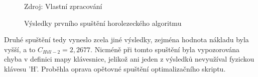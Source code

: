 \documentclass[a4paper, twoside, 12pt, czech]{article}
\begin{document}
\begin{figure}[h]
    \centering
    \caption{Výsledky prvního spuštění horolezeckého algoritmu}
    \vspace{0.5cm}
    \begin{keyboardlayout}
                     
        \newrow
                     
        \newrow
                    
        \newrow
                   
        \newrow
               
    \end{keyboardlayout}
    \small{Zdroj: Vlastní zpracování}
    \label{pic:hcwrong}
\end{figure}


Druhé spuštění tedy vyneslo zcela jiné výsledky, zejména hodnota nákladu
byla vyšší, a to $C_{Hill-2}=2,2677$. Nicméně při tomto spuštění byla vypozorována chyba 
v definici mapy klávesnice, jelikož ani jeden z výsledků nevyužíval fyzickou klávesu 
'H'. Proběhla oprava opětovné spuštění optimalizačního skriptu.
\end{document}
